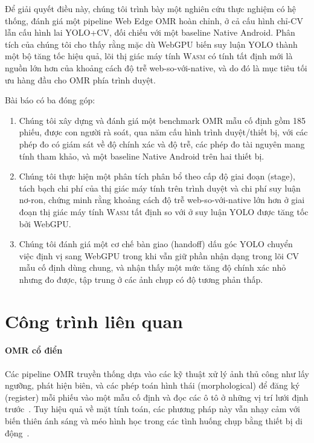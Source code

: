 \documentclass[conference]{IEEEtran}
\newcommand{\wasm}{\textnormal{\textsc{Wasm}}}
\begin{document}
Để giải quyết điều này, chúng tôi trình bày một nghiên cứu thực nghiệm có hệ
thống, đánh giá một pipeline Web Edge OMR hoàn chỉnh, ở cả cấu hình chỉ-CV lẫn
cấu hình lai YOLO+CV, đối chiếu với một baseline Native Android. Phân tích của
chúng tôi cho thấy rằng mặc dù WebGPU biến suy luận YOLO thành một bộ tăng tốc
hiệu quả, lõi thị giác máy tính \wasm{} có tính tất định mới là nguồn lớn hơn của
khoảng cách độ trễ web-so-với-native, và do đó là mục tiêu tối ưu hàng đầu cho
OMR phía trình duyệt.

Bài báo có ba đóng góp:
\begin{enumerate}[leftmargin=*, itemsep=1pt, topsep=2pt]
  \item Chúng tôi xây dựng và đánh giá một benchmark OMR mẫu cố định gồm 185
phiếu, được con người rà soát, qua năm cấu hình trình duyệt/thiết bị, với các
phép đo có giám sát về độ chính xác và độ trễ, các phép đo tài nguyên mang tính
tham khảo, và một baseline Native Android trên hai thiết bị.
  \item Chúng tôi thực hiện một phân tích phân bổ theo cấp độ giai đoạn (stage),
  tách bạch chi phí của thị giác máy tính trên trình duyệt và chi phí suy luận
  nơ-ron, chứng minh rằng khoảng cách độ trễ web-so-với-native lớn hơn ở giai
  đoạn thị giác máy tính \wasm{} tất định so với ở suy luận YOLO được tăng tốc
  bởi WebGPU.
  \item Chúng tôi đánh giá một cơ chế bàn giao (handoff) dấu góc YOLO chuyển việc
  định vị sang WebGPU trong khi vẫn giữ phần nhận dạng trong lõi CV mẫu cố định
  dùng chung, và nhận thấy một mức tăng độ chính xác nhỏ nhưng đo được, tập trung
  ở các ảnh chụp có độ tương phản thấp.
\end{enumerate}

\section{Công trình liên quan}

\paragraph{OMR cổ điển}
Các pipeline OMR truyền thống dựa vào các kỹ thuật xử lý ảnh thủ công như lấy
ngưỡng, phát hiện biên, và các phép toán hình thái (morphological) để đăng ký
(register) mỗi phiếu vào một mẫu cố định và đọc các ô tô ở những vị trí lưới định
trước~\cite{patel2015,okorie2022}. Tuy hiệu quả về mặt tính toán, các phương pháp
này vẫn nhạy cảm với biến thiên ánh sáng và méo hình học trong các tình huống
chụp bằng thiết bị di động~\cite{afifi2019}.
\end{document}
